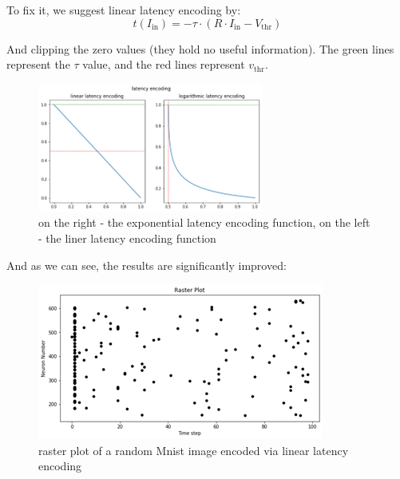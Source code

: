 To fix it, we suggest linear latency encoding by:
\begin{equation}
t(I_{\text{in}}) = -\tau \cdot \left(R \cdot I_{\text{in}} - V_{\text{thr}}\right)
\end{equation}

And clipping the zero values (they hold no useful information). The green lines represent the $\tau$ value, and the red lines represent $v_{\text{thr}}$.

\begin{figure}[H]
    \centering
    \includegraphics[width=0.5\linewidth]{methods/spike-encoding/graphs/exp-to-linear.png}
    \caption{on the right - the exponential latency encoding function, on the left - the liner latency encoding function}
    \label{fig:latency-exp-vs-lin}
\end{figure}

And as we can see, the results are significantly improved:

\begin{figure}[H]
    \centering
    \includegraphics[width=0.7\linewidth]{methods/spike-encoding/graphs/latency-encoding-raster-linear.png}
    \caption{ raster plot of a random Mnist image encoded via linear latency encoding}
    \label{fig:latency-encoding-raster-linear}
\end{figure}